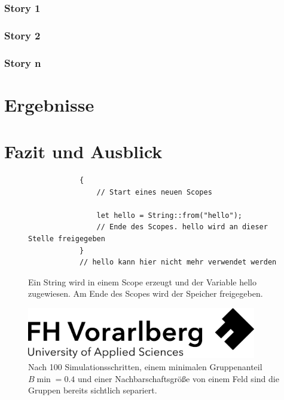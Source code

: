 \documentclass[a4paper, fontsize=11pt, parskip=half, twoside]{scrreprt}
\begin{document}
	\subsection{Story 1}
	
	\subsection{Story 2}
	
	\subsection{Story n}
	
	
	
	\chapter{Ergebnisse}
	
	
	
	\chapter{Fazit und Ausblick}
	
	
	
	\begin{figure}[ht]
		\begin{verbatim}
			{
				// Start eines neuen Scopes
				
				let hello = String::from("hello");
				// Ende des Scopes. hello wird an dieser Stelle freigegeben
			}
			// hello kann hier nicht mehr verwendet werden
		\end{verbatim}
		\caption{Ein String wird in einem Scope erzeugt und der Variable hello zugewiesen. Am Ende des Scopes wird der Speicher freigegeben.}
		\label{fig:drop:example}
	\end{figure}
	
	\begin{figure}[H]
		\centering
		\includegraphics[width = 10cm]{assets/Logo-A3.jpg}
		\caption{Nach 100 Simulationsschritten, einem minimalen Gruppenanteil $B{\min} = 0.4$ und einer Nachbarschaftsgröße von einem Feld sind die Gruppen bereits sichtlich separiert.}
		\label{fig:schelling_end}
	\end{figure}
	
\end{document}
